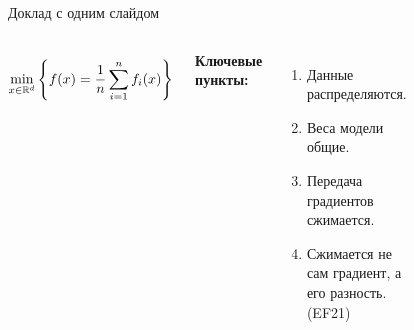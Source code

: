 \documentclass{beamer}
\begin{document}
\begin{frame}{Доклад с одним слайдом}
\begin{columns}[c]
\begin{align*}
    \min \limits_{x \in \mathbb{R}^d} \left\{ f(x) = \frac{1}{n} \sum \limits_{i=1}^n f_i(x) \right\}
    \end{align*}

    \textbf{Ключевые пункты:}
    \begin{enumerate}
        \item Данные распределяются.
        \item Веса модели общие.
        \item Передача градиентов сжимается.
        \item Сжимается не сам градиент, а его разность. (EF21)
    \end{enumerate}

\begin{figure}
\includegraphics[width=1.0\textwidth]{output1.png}
\end{figure}\begin{figure}
\includegraphics[width=0.8\textwidth]{img3.png}
\end{figure}

\end{columns}

\end{frame}
\newcommand{\sqnorm}[1]{\left\lVert#1\right\rVert^2}
\newcommand{\algname}[1]{{\sf \footnotesize #1}\xspace}
\end{document}
